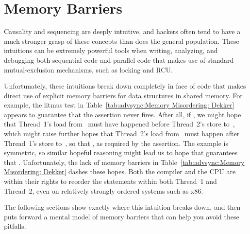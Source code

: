 
\section{Memory Barriers}
\label{sec:advsync:Memory Barriers}

Causality and sequencing are deeply intuitive, and hackers often
tend to have a much stronger grasp of these concepts than does
the general population.
These intuitions can be extremely powerful tools when writing, analyzing,
and debugging both sequential code and parallel code that makes
use of standard mutual-exclusion mechanisms, such as locking and
RCU.

\begin{table}
\caption{Memory Misordering: Dekker}
\label{tab:advsync:Memory Misordering: Dekker}
\end{table}

Unfortunately, these intuitions break down completely in face of
code that makes direct use of explicit memory barriers for data structures
in shared memory.
For example, the litmus test in
Table~\ref{tab:advsync:Memory Misordering: Dekker}
appears to guarantee that the assertion never fires.
After all, if , we might hope that Thread~1's load from~
must have happened before Thread~2's store to~, which might raise
further hopes that Thread~2's load from~ must happen after
Thread~1's store to~, so that , as required by the
assertion.
The example is symmetric, so similar hopeful reasoning might lead
us to hope that  guarantees that .
Unfortunately, the lack of memory barriers in
Table~\ref{tab:advsync:Memory Misordering: Dekker}
dashes these hopes.
Both the compiler and the CPU are within their rights to reorder
the statements within both Thread~1 and Thread~2, even on relatively
strongly ordered systems such as x86.

The following sections show exactly where this intuition breaks down,
and then puts forward a mental model of memory barriers that can help
you avoid these pitfalls.

